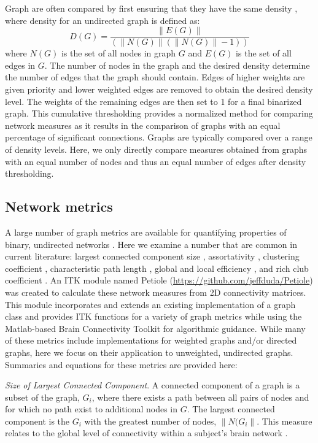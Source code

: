 \documentclass{frontiersSCNS} %
\begin{document}
Graph are often compared by first ensuring that they have the same density \citep{Achard2006,Bassett2006}, where density for an undirected graph is defined as:
$$D(G) = \frac{\|E(G)\|}{( \|N(G)\| (\|N(G)\|-1) )} $$
where $N(G)$ is the set of all nodes in graph $G$ and $E(G)$ is the set of all edges in $G$. The number of nodes in the graph and the desired density determine the number of edges that the graph should contain. Edges of higher weights are given priority and lower weighted edges are removed to obtain the desired density level. The weights of the remaining edges are then set to 1 for a final binarized graph. This cumulative thresholding provides a normalized method for comparing network measures as it results in the comparison of graphs with an equal percentage of significant connections. Graphs are typically compared over a range of density levels.  Here, we only directly compare measures obtained from graphs with an equal number of nodes and thus an equal number of edges after density thresholding.

\subsection{Network metrics}
A large number of graph metrics are available for quantifying properties of binary, undirected networks \citep{Rubinov2010}. Here we examine a number that 
are common in current literature: largest connected component size \citep{Bassett2011N}, assortativity \citep{Newman2006a,Bassett2008}, clustering coefficient \citep{Watts1998}, characteristic path length \citep{Watts1998}, global and local efficiency \citep{Latora2001}, and rich club coefficient \citep{Collin2013}. An ITK module named Petiole (\url{https://github.com/jeffduda/Petiole}) was created to calculate these network measures from 2D connectivity
matrices. This module incorporates and extends an existing implementation of a graph class \citep{Tustison2008} and provides ITK functions for a variety of graph metrics while using the Matlab-based Brain Connectivity Toolkit \citep{Rubinov2010} for algorithmic guidance. While many of these metrics include implementations for weighted graphs and/or directed graphs, here we focus on their application to unweighted, undirected graphs. Summaries and equations for these metrics are provided here:

\emph{Size of Largest Connected Component}.  A connected component of a graph is a subset of the graph, $G_{i}$, where there exists a path between all pairs of nodes and for which no path exist to additional nodes in $G$. The largest connected component is the $G_{i}$ with the greatest number of nodes, $\|N(G_{i}\|$. This measure relates to the global level of connectivity within a subject's brain network \citep{Bassett2011N}.
\end{document}
